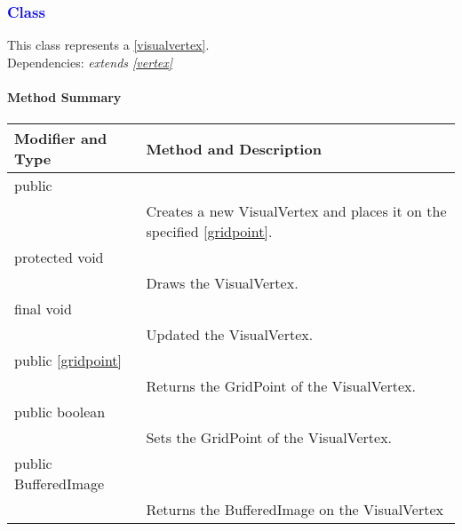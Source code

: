 \subsubsection*{\textcolor{Blue}{Class }}
This class represents a \ref{visualvertex}. \\
Dependencies: \textit{extends \ref{vertex}}
\paragraph*{Method Summary}
\paragraph*{}
\begin{longtable}{Lp{10cm}}
	\hline
    \textbf{Modifier and Type} & \textbf{Method and Description} \\ \hline
	public & \textcolor{NavyBlue}{} \\
	& Creates a new VisualVertex and places it on the specified \ref{gridpoint}. \\
	protected void & \textcolor{NavyBlue}{} \\
	& Draws the VisualVertex. \\
	final void & \textcolor{NavyBlue}{} \\
	& Updated the VisualVertex. \\ 
	public \ref{gridpoint} & \textcolor{NavyBlue}{}\\
	& Returns the GridPoint of the VisualVertex. \\ 
	public boolean & \textcolor{NavyBlue}{} \\
	& Sets the GridPoint of the VisualVertex. \\
	public BufferedImage & \textcolor{NavyBlue}{} \\
	& Returns the BufferedImage on the VisualVertex \\ \hline
\end{longtable}
